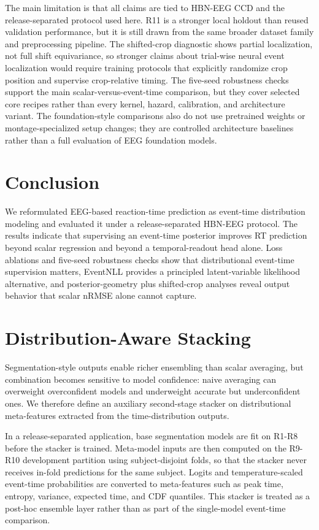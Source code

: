 \documentclass[12pt]{article}
\begin{document}
The main limitation is that all claims are tied to HBN-EEG CCD and the release-separated protocol used here. R11 is a stronger local holdout than reused validation performance, but it is still drawn from the same broader dataset family and preprocessing pipeline. The shifted-crop diagnostic shows partial localization, not full shift equivariance, so stronger claims about trial-wise neural event localization would require training protocols that explicitly randomize crop position and supervise crop-relative timing. The five-seed robustness checks support the main scalar-versus-event-time comparison, but they cover selected core recipes rather than every kernel, hazard, calibration, and architecture variant. The foundation-style comparisons also do not use pretrained weights or montage-specialized setup changes; they are controlled architecture baselines rather than a full evaluation of EEG foundation models.

\section{Conclusion}

We reformulated EEG-based reaction-time prediction as event-time distribution modeling and evaluated it under a release-separated HBN-EEG protocol. The results indicate that supervising an event-time posterior improves RT prediction beyond scalar regression and beyond a temporal-readout head alone. Loss ablations and five-seed robustness checks show that distributional event-time supervision matters, EventNLL provides a principled latent-variable likelihood alternative, and posterior-geometry plus shifted-crop analyses reveal output behavior that scalar nRMSE alone cannot capture.

\appendix

\section{Distribution-Aware Stacking}
\label{sec:rt_stacking}
Segmentation-style outputs enable richer ensembling than scalar averaging, but combination becomes sensitive to model confidence: naive averaging can overweight overconfident models and underweight accurate but underconfident ones. We therefore define an auxiliary second-stage stacker on distributional meta-features extracted from the time-distribution outputs.

In a release-separated application, base segmentation models are fit on R1-R8 before the stacker is trained. Meta-model inputs are then computed on the R9-R10 development partition using subject-disjoint folds, so that the stacker never receives in-fold predictions for the same subject. Logits and temperature-scaled event-time probabilities are converted to meta-features such as peak time, entropy, variance, expected time, and CDF quantiles. This stacker is treated as a post-hoc ensemble layer rather than as part of the single-model event-time comparison.
\end{document}
